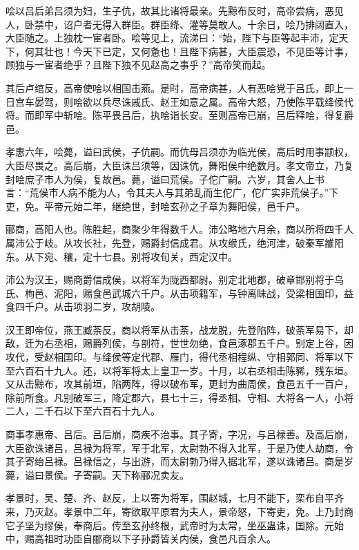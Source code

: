 \documentclass[12pt,UTF8]{ctexbook}
\begin{document}
哙以吕后弟吕须为妇，生子伉，故其比诸将最亲。先黥布反时，高帝尝病，恶见人，卧禁中，诏户者无得入群臣。群臣绛、灌等莫敢人。十余日，哙乃排闼直入，大臣随之。上独枕一宦者卧。哙等见上，流涕曰：“始，陛下与臣等起丰沛，定天下，何其壮也！今天下已定，又何惫也！且陛下病甚，大臣震恐，不见臣等计事，顾独与一宦者绝乎？且陛下独不见赵高之事乎？”高帝笑而起。



其后卢绾反，高帝使哙以相国击燕。是时，高帝病甚，人有恶哙党于吕氏，即上一日宫车晏驾，则哙欲以兵尽诛戚氏、赵王如意之属。高帝大怒，乃使陈平载绛侯代将。而即军中斩哙。陈平畏吕后，执哙诣长安。至则高帝已崩，吕后释哙，得复爵邑。



孝惠六年，哙薨，谥曰武侯，子伉嗣。而伉母吕须亦为临光侯，高后时用事颛权，大臣尽畏之。高后崩，大臣诛吕须等，因诛伉，舞阳侯中绝数月。孝文帝立，乃复封哙庶子市人为侯，复故邑。薨，谥曰荒侯。子佗广嗣。六岁，其舍人上书言：“荒侯市人病不能为人，令其夫人与其弟乱而生佗广，佗广实非荒侯子。”下吏，免。平帝元始二年，继绝世，封哙玄孙之子章为舞阳侯，邑千户。



郦商，高阳人也。陈胜起，商聚少年得数千人。沛公略地六月余，商以所将四千人属沛公于岐。从攻长社，先登，赐爵封信成君。从攻缑氏，绝河津，破秦军雒阳东。从下宛、穰，定十七县。别将攻旬关，西定汉中。



沛公为汉王，赐商爵信成侯，以将军为陇西都尉。别定北地郡，破章邯别将于乌氏、栒邑、泥阳，赐食邑武城六千户。从击项籍军，与钟离眛战，受梁相国印，益食四千户。从击项羽二岁，攻胡陵。



汉王即帝位，燕王臧荼反，商以将军从击荼，战龙脱，先登陷阵，破荼军易下，却敌，迁为右丞相，赐爵列侯，与剖符，世世勿绝，食邑涿郡五千户。别定上谷，因攻代，受赵相国印。与绛侯等定代郡、雁门，得代丞相程纵、守相郭同、将军以下至六百石十九人。还，以将军将太上皇卫一岁。十月，以右丞相击陈豨，残东垣。又从击黥布，攻其前垣，陷两阵，得以破布军，更封为曲周侯，食邑五千一百户，除前所食。凡别破军三，降定郡六，县七十三，得丞相、守相、大将各一人，小将二人，二千石以下至六百石十九人。



商事孝惠帝、吕后。吕后崩，商疾不治事。其子寄，字况，与吕禄善。及高后崩，大臣欲诛诸吕，吕禄为将军，军于北军，太尉勃不得入北军，于是乃使人劫商，令其子寄绐吕禄。吕禄信之，与出游，而太尉勃乃得入据北军，遂以诛诸吕。商是岁薨，谥曰景侯。子寄嗣。天下称郦况卖友。



孝景时，吴、楚、齐、赵反，上以寄为将军，围赵城，七月不能下，栾布自平齐来，乃灭赵。孝景中二年，寄欲取平原君为夫人，景帝怒，下寄吏，免。上乃封商它子坚为缪侯，奉商后。传至玄孙终根，武帝时为太常，坐巫蛊诛，国除。元始中，赐高祖时功臣自郦商以下子孙爵皆关内侯，食邑凡百余人。
\end{document}
